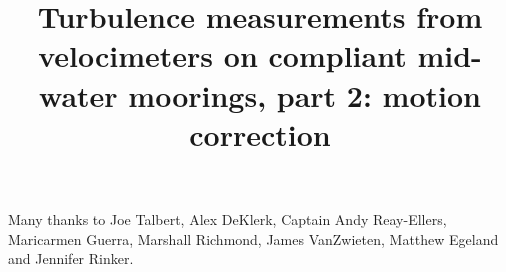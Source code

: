 \documentclass[twocol]{ametsoc}
\title{Turbulence measurements from velocimeters on compliant mid-water moorings, part 2: motion correction}
\affiliation{}
\begin{document}
\maketitle













\acknowledgments

Many thanks to Joe Talbert, Alex DeKlerk, Captain Andy Reay-Ellers, Maricarmen Guerra, Marshall Richmond, James VanZwieten, Matthew Egeland and Jennifer Rinker.

\clearpage %

\appendix






\end{document}
